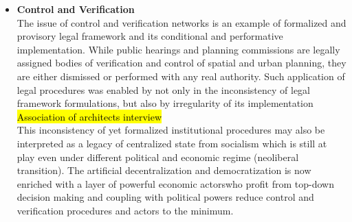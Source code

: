 \documentclass[11pt]{report}
\begin{document}
\begin{itemize}
\item \textbf{Control and Verification}
\\
The issue of control and verification networks is an example of formalized and provisory legal framework and its conditional and performative implementation. While public hearings and planning commissions are legally assigned bodies of verification and control of spatial and urban planning, they are either dismissed or performed with any real authority. \footnotemark
Such application of legal procedures was enabled by not only in the inconsistency of legal framework formulations, but also by irregularity of its implementation \hl{Association of architects interview}
\\
This inconsistency of yet formalized institutional procedures may also be interpreted as a legacy of centralized state from socialism which is still at play even under different political and economic regime (neoliberal transition). The artificial decentralization and democratization is now enriched with a layer of powerful economic actors\footnotemark who profit from top-down decision making and coupling with political powers reduce control and verification procedures and actors to the minimum.


\end{itemize}
\end{document}
